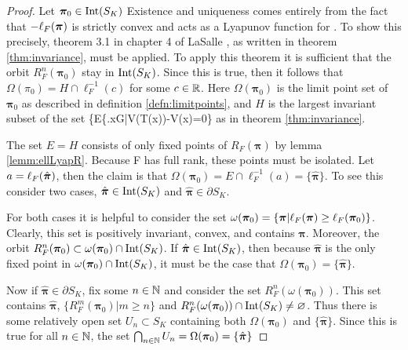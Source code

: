 \begin{proof}
	Let \( \bm\pi_0\in\op{Int}(S_K)  \)
	Existence and uniqueness comes entirely from the fact that \( -\elpi{F} \) is strictly convex and acts as a Lyapunov function for . To show this precisely, theorem 3.1 in chapter 4 of LaSalle \cite{lasalle1976dynsys}, as written in theorem \ref{thm:invariance}, must be applied. To apply this theorem it is sufficient that the orbit \( R_F^n(\bm\pi_0) \) stay in \(\op{Int}(S_K)\). Since this is true, then it follows that \( \Omega(\pi_0) = H\cap \ell_{F}^{-1}(c) \) for some \( c\in \R \).	Here \( \Omega(\bm\pi_0) \) is the limit point set of \( \bm\pi_0 \) as described in definition \ref{defn:limitpoints}, and \( H \) is the largest invariant subset of the set \{E\{\left.x\in\overbar G\right|V(T(x))-V(x)=0\} as in theorem \ref{thm:invariance}. %
	
	The set \( E=H \) consists of only fixed points of \( R_{F}(\bm\pi) \) by lemma \ref{lemm:ellLyapR}. Because F has full rank, these points must be isolated. Let \( a=\elpi[\hat{\bm \pi}]{F} \), then the claim is that \( \Omega(\bm\pi_0) =E\cap\ell_{F}^{-1}(a)= \{\hat{\bm\pi}\}. \) To see this consider two cases, \( \hat{\bm \pi}\in \op{Int}(S_K) \) and \( \hat{\bm \pi}\in \partial S_K \). 
	
    For both cases it is helpful to consider the set \(\omega(\bm\pi_0) = \{\bm\pi|\elpi{F}\geq\ell_{F}(\bm\pi_0)\}\). Clearly, this set is positively invariant, convex, and contains \( \hat{\bm \pi}. \)  Moreover, the orbit \( R_F^n(\bm\pi_0) \subset \omega(\bm\pi_0)\cap \op{Int}(S_K)\). If \( \hat{\bm \pi}\in \op{Int}(S_K) \), then because \( \hat{\bm\pi} \)  is the only fixed point in \( \omega(\bm\pi_0)\cap \op{Int}(S_K) \), it must be the case that \( \Omega(\bm\pi_0) = \{\hat{\bm\pi}\} \).
    
    Now if \( \hat{\bm \pi}\in \partial S_K \), fix some \( n\in\N \) and consider the set \( R_F^n(\omega(\bm\pi_0)). \) This set contains \( \hat{\bm \pi} \), \( \{R_F^m(\bm\pi_0)|m\geq n\} \) and \( R_F^n(\omega(\bm\pi_0))\cap\op{Int}(S_K)\neq\varnothing \). Thus there is some relatively open set \( U_n \subset S_K\) containing both \( \Omega(\bm\pi_0) \) and \( \{\hat{\bm\pi}\} \). Since this is true for all \( n\in\N \), the set \( \bigcap_{n\in\N}U_n = \Omega(\bm\pi_0)=\{\hat{\bm\pi}\} \)	
\end{proof}

